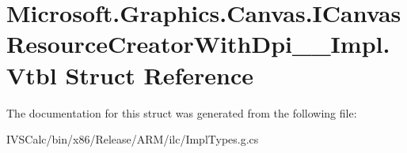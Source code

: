 \hypertarget{struct_microsoft_1_1_graphics_1_1_canvas_1_1_i_canvas_resource_creator_with_dpi_____impl_1_1_vtbl}{}\section{Microsoft.\+Graphics.\+Canvas.\+I\+Canvas\+Resource\+Creator\+With\+Dpi\+\_\+\+\_\+\+Impl.\+Vtbl Struct Reference}
\label{struct_microsoft_1_1_graphics_1_1_canvas_1_1_i_canvas_resource_creator_with_dpi_____impl_1_1_vtbl}


The documentation for this struct was generated from the following file\+:\begin{DoxyCompactItemize}
\item 
I\+V\+S\+Calc/bin/x86/\+Release/\+A\+R\+M/ilc/Impl\+Types.\+g.\+cs\end{DoxyCompactItemize}
